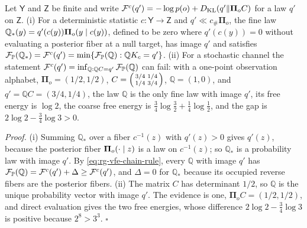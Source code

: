 \label{eq:rg-thermo-finite-unwarranted-infimum}
\label{eq:rg-thermo-finite-stochastic-infimum-witness}
Let $\mathsf Y$ and $\mathsf Z$ be finite and write
$\mathcal F^c(q')=-\log p(o)+D_{\mathrm{KL}}(q'\Vert\boldsymbol\Pi_oC)$ for a law $q'$ on $\mathsf Z$. (i) For a
deterministic statistic $c:\mathsf Y\to\mathsf Z$ and $q'\ll c_\#\boldsymbol\Pi_o$, the fine law
$\mathbb Q_*(y)=q'(c(y))\boldsymbol\Pi_o(y\mid c(y))$, defined to be zero where $q'(c(y))=0$
without evaluating a posterior fiber at a null target, has image $q'$ and satisfies
$\mathcal F_{\mathbb P}(\mathbb Q_*)=\mathcal F^c(q')=\min\{\mathcal F_{\mathbb P}(\mathbb Q):
\mathbb QK_c=q'\}$. (ii) For a stochastic channel the statement
$\mathcal F^c(q')=\inf_{\mathbb Q:\mathbb QC=q'}\mathcal F_{\mathbb P}(\mathbb Q)$ can fail: with a
one-point observation alphabet, $\boldsymbol\Pi_o=(1/2,1/2)$,
$C=\begin{psmallmatrix}3/4&1/4\\1/4&3/4\end{psmallmatrix}$, $\mathbb Q=(1,0)$, and
$q'=\mathbb QC=(3/4,1/4)$, the law $\mathbb Q$ is the only fine law with image $q'$, its free
energy is $\log2$, the coarse free energy is $\tfrac34\log\tfrac32+\tfrac14\log\tfrac12$, and the gap
is $2\log2-\tfrac34\log3>0$. 

\noindent\emph{Proof.}
(i) Summing $\mathbb Q_*$ over a fiber $c^{-1}(z)$ with $q'(z)>0$ gives $q'(z)$, because the
posterior fiber $\boldsymbol\Pi_o(\cdot\mid z)$ is a law on $c^{-1}(z)$; so $\mathbb Q_*$ is a
probability law with image $q'$. By \eqref{eq:rg-vfe-chain-rule}, every $\mathbb Q$ with image $q'$
has $\mathcal F_{\mathbb P}(\mathbb Q)=\mathcal F^c(q')+\Delta\geq\mathcal F^c(q')$, and $\Delta=0$ for
$\mathbb Q_*$ because its occupied reverse fibers are the posterior fibers. (ii) The matrix $C$ has
determinant $1/2$, so $\mathbb Q$ is the unique probability vector with image $q'$. The evidence is
one, $\boldsymbol\Pi_oC=(1/2,1/2)$, and direct evaluation gives the two free energies, whose
difference $2\log2-\tfrac34\log3$ is positive because $2^8>3^3$. $\square$

